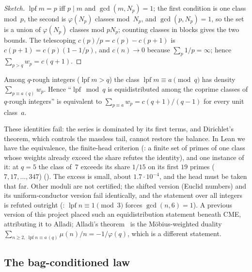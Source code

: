 \documentclass[10pt,a4paper]{article}
\newcommand{\lpf}{\operatorname{lpf}}
\begin{document}
\begin{proof}[Sketch]
$\lpf m=p$ iff $p\mid m$ and $\gcd(m,N_p)=1$; the first condition is one
class mod~$p$, the second is $\varphi(N_p)$ classes mod~$N_p$, and
$\gcd(p,N_p)=1$, so the set is a union of $\varphi(N_p)$ classes mod
$pN_p$; counting classes in blocks gives the two bounds.  The telescoping
$c(p)/p=c(p)-c(p{+}1)$ is $c(p{+}1)=c(p)(1-1/p)$, and $c(n)\to0$ because
$\sum_p1/p=\infty$; hence $\sum_{p>q}w_p=c(q{+}1)$.
\end{proof}

\begin{corollary}
Among $q$-rough integers ($\lpf m>q$) the class $\lpf m\equiv a\pmod q$ has
density $\sum_{p\equiv a\,(q)}w_p$.  Hence ``$\lpf\bmod q$ is equidistributed
among the coprime classes of $q$-rough integers'' is equivalent to
$\sum_{p\equiv a}w_p=c(q{+}1)/(q-1)$ for every unit class~$a$.
\end{corollary}

These identities fail: the series is dominated by its first terms, and
Dirichlet's theorem, which controls the massless tail, cannot restore the
balance.  In Lean we have the equivalence, the finite-head criterion
(:
a finite set of primes of one class whose weights already exceed the share
refutes the identity), and one instance of it: at $q=5$ the class of~$7$
exceeds its share $1/15$ on its first $19$ primes ($7,17,\dots,347$)
().
The excess is small, about $1.7\cdot10^{-4}$, and the head must be taken
that far.  Other moduli are not certified; the shifted version (Euclid
numbers) and its uniform-conductor version fail identically, and the
statement over all integers is refuted outright
(: $\lpf n\equiv1
\pmod3$ forces $\gcd(n,6)=1$).  A previous version of this project placed
such an equidistribution statement beneath CME, attributing it to Alladi;
Alladi's theorem~\cite{Alladi1977} is the M\"obius-weighted duality
$\sum_{n\ge2,\ \lpf n\equiv a\,(q)}\mu(n)/n=-1/\varphi(q)$, which is a
different statement.

\subsection{The bag-conditioned law}
\end{document}
